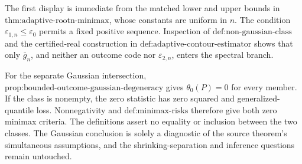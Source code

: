 The first display is immediate from the matched lower and upper bounds in \(\text{thm:adaptive-rootn-minimax}\), whose constants are uniform in \(n\).  The condition \(\varepsilon_{1,n}\le\varepsilon_0\) permits a fixed positive sequence.  Inspection of \(\text{def:non-gaussian-class}\) and the certified-real construction in \(\text{def:adaptive-contour-estimator}\) shows that only \(\bar g_n\), and neither an outcome code nor \(\varepsilon_{2,n}\), enters the spectral branch.

For the separate Gaussian intersection, \(\text{prop:bounded-outcome-gaussian-degeneracy}\) gives \(\theta_0(P)=0\) for every member.  If the class is nonempty, the zero statistic has zero squared and generalized-quantile loss.  Nonnegativity and \(\text{def:minimax-risks}\) therefore give both zero minimax criteria.  The definitions assert no equality or inclusion between the two classes.  The Gaussian conclusion is solely a diagnostic of the source theorem's simultaneous assumptions, and the shrinking-separation and inference questions remain untouched.